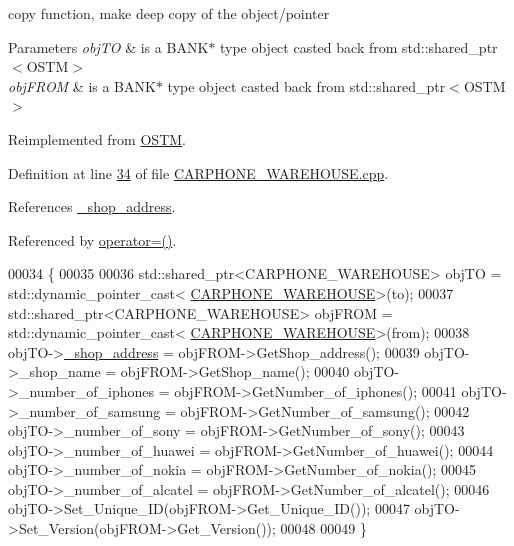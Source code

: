 copy function, make deep copy of the object/pointer 


\begin{DoxyParams}{Parameters}
{\em obj\+TO} & is a B\+A\+N\+K$\ast$ type object casted back from std\+::shared\+\_\+ptr$<$\+O\+S\+T\+M$>$ \\
\hline
{\em obj\+F\+R\+OM} & is a B\+A\+N\+K$\ast$ type object casted back from std\+::shared\+\_\+ptr$<$\+O\+S\+T\+M$>$ \\
\hline
\end{DoxyParams}


Reimplemented from \hyperlink{class_o_s_t_m_a535d90fced5adbb70312c92f3778e08d_a535d90fced5adbb70312c92f3778e08d}{O\+S\+TM}.



Definition at line \hyperlink{_c_a_r_p_h_o_n_e___w_a_r_e_h_o_u_s_e_8cpp_source_l00034}{34} of file \hyperlink{_c_a_r_p_h_o_n_e___w_a_r_e_h_o_u_s_e_8cpp_source}{C\+A\+R\+P\+H\+O\+N\+E\+\_\+\+W\+A\+R\+E\+H\+O\+U\+S\+E.\+cpp}.



References \hyperlink{_c_a_r_p_h_o_n_e___w_a_r_e_h_o_u_s_e_8h_source_l00111}{\+\_\+shop\+\_\+address}.



Referenced by \hyperlink{_c_a_r_p_h_o_n_e___w_a_r_e_h_o_u_s_e_8h_source_l00075}{operator=()}.


\begin{DoxyCode}
00034                                                                              \{
00035 
00036     std::shared\_ptr<CARPHONE\_WAREHOUSE> objTO = std::dynamic\_pointer\_cast<
      \hyperlink{class_c_a_r_p_h_o_n_e___w_a_r_e_h_o_u_s_e}{CARPHONE\_WAREHOUSE}>(to);
00037     std::shared\_ptr<CARPHONE\_WAREHOUSE> objFROM = std::dynamic\_pointer\_cast<
      \hyperlink{class_c_a_r_p_h_o_n_e___w_a_r_e_h_o_u_s_e}{CARPHONE\_WAREHOUSE}>(from);
00038     objTO->\hyperlink{class_c_a_r_p_h_o_n_e___w_a_r_e_h_o_u_s_e_a085b59da7d9f351043de6398b98898a7_a085b59da7d9f351043de6398b98898a7}{\_shop\_address} = objFROM->GetShop\_address();
00039     objTO->\_shop\_name = objFROM->GetShop\_name();
00040     objTO->\_number\_of\_iphones = objFROM->GetNumber\_of\_iphones();
00041     objTO->\_number\_of\_samsung = objFROM->GetNumber\_of\_samsung();
00042     objTO->\_number\_of\_sony = objFROM->GetNumber\_of\_sony();
00043     objTO->\_number\_of\_huawei = objFROM->GetNumber\_of\_huawei();
00044     objTO->\_number\_of\_nokia = objFROM->GetNumber\_of\_nokia();
00045     objTO->\_number\_of\_alcatel = objFROM->GetNumber\_of\_alcatel();
00046     objTO->Set\_Unique\_ID(objFROM->Get\_Unique\_ID());
00047     objTO->Set\_Version(objFROM->Get\_Version());
00048    
00049 \}
\end{DoxyCode}
